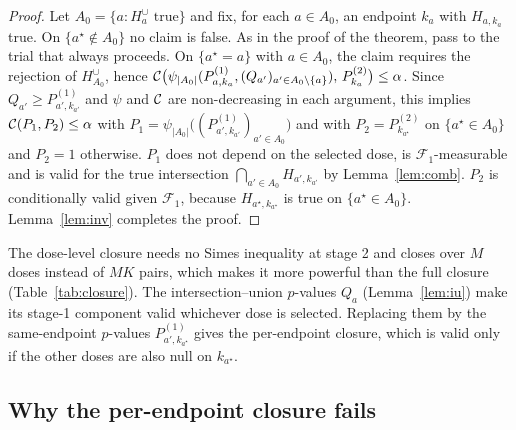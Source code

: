 \begin{appendix}
\begin{proof}
Let $A_0=\{a:H^\cup_a\text{ true}\}$ and fix, for each $a\in A_0$, an endpoint $k_a$ with $H_{a,k_a}$ true. On $\{a^\star\notin A_0\}$ no claim is false. As in the proof of the theorem, pass to the trial that always proceeds. On $\{a^\star=a\}$ with $a\in A_0$, the claim requires the rejection of $H^\cup_{A_0}$, hence $\mathcal{C}\big(\psi_{|A_0|}(P^{(1)}_{a,k_a},(Q_{a'})_{a'\in A_0\setminus\{a\}}),\,P^{(2)}_{k_a}\big)\le\alpha$. Since $Q_{a'}\ge P^{(1)}_{a',k_{a'}}$ and $\psi$ and $\mathcal{C}$ are non-decreasing in each argument, this implies $\mathcal{C}(P_1,P_2)\le\alpha$ with $P_1=\psi_{|A_0|}\big((P^{(1)}_{a',k_{a'}})_{a'\in A_0}\big)$ and with $P_2=P^{(2)}_{k_{a^\star}}$ on $\{a^\star\in A_0\}$ and $P_2=1$ otherwise. $P_1$ does not depend on the selected dose, is $\mathcal F_1$-measurable and is valid for the true intersection $\bigcap_{a'\in A_0}H_{a',k_{a'}}$ by Lemma~\ref{lem:comb}. $P_2$ is conditionally valid given $\mathcal F_1$, because $H_{a^\star,k_{a^\star}}$ is true on $\{a^\star\in A_0\}$. Lemma~\ref{lem:inv} completes the proof.
\end{proof}

The dose-level closure needs no Simes inequality at stage 2 and closes over $M$ doses instead of $MK$ pairs, which makes it more powerful than the full closure (Table~\ref{tab:closure}). The intersection--union $p$-values $Q_a$ (Lemma~\ref{lem:iu}) make its stage-1 component valid whichever dose is selected. Replacing them by the same-endpoint $p$-values $P^{(1)}_{a',k_{a^\star}}$ gives the per-endpoint closure, which is valid only if the other doses are also null on $k_{a^\star}$.

\subsection{Why the per-endpoint closure fails}\label{app:counter}


\end{appendix}
